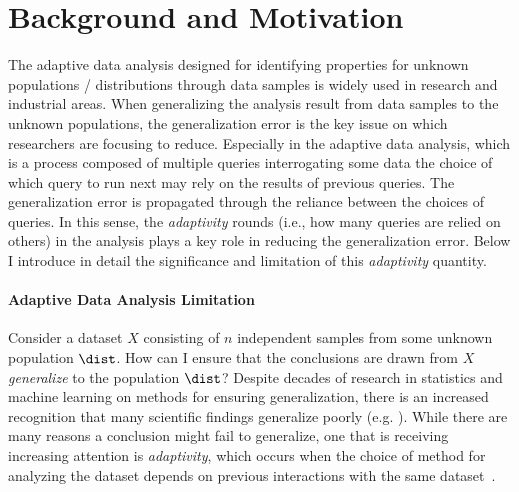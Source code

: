 \section{Background and Motivation}
\label{sec:intro-motivation}
  
The adaptive data analysis designed for identifying  properties for unknown populations / distributions 
through data samples is widely 
used in research and industrial areas.
When generalizing the analysis result from data samples to the unknown populations, 
the generalization error is the key issue on which researchers are focusing to reduce.
Especially in the adaptive data analysis,
which is a process composed of 
multiple queries interrogating some data
the choice of which query to run next may rely on the results of previous queries. 
The generalization error is propagated through the reliance between the choices of queries.
In this sense, the \emph{adaptivity} rounds (i.e., how many queries are relied on others) in the analysis plays a key role in reducing the generalization error.
Below I introduce in detail the significance and limitation of this \emph{adaptivity} quantity.
\paragraph{Adaptive Data Analysis Limitation}
\label{sec:intro-exelimitation}
Consider a dataset $X$ consisting of $n$ independent samples from some unknown population $\dist$. How can I ensure that the conclusions are drawn from $X$ \emph{generalize} to the population $\dist$? Despite decades of research in statistics and machine learning on methods for ensuring generalization, there is an increased recognition that many scientific findings generalize poorly (e.g. 
\cite{Ioannidis05,GelmanL13}
). While there are many reasons a conclusion might fail to generalize, one that is receiving increasing attention is \emph{adaptivity}, which occurs when the choice of method for analyzing the dataset depends on previous interactions with the same dataset~\cite{GelmanL13}.

